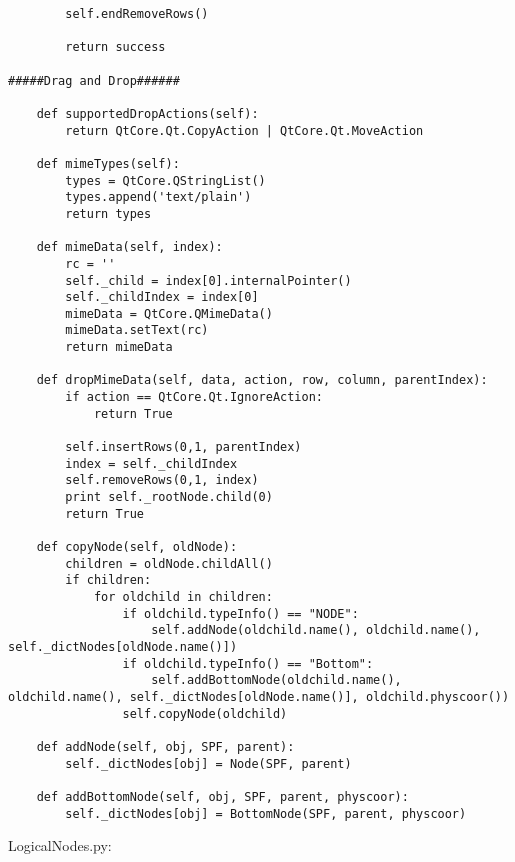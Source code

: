 \begin{verbatim}
        self.endRemoveRows()

        return success

#####Drag and Drop######

    def supportedDropActions(self):
        return QtCore.Qt.CopyAction | QtCore.Qt.MoveAction

    def mimeTypes(self):
        types = QtCore.QStringList()
        types.append('text/plain')
        return types

    def mimeData(self, index):  
        rc = ''
        self._child = index[0].internalPointer()
        self._childIndex = index[0]
        mimeData = QtCore.QMimeData()
        mimeData.setText(rc)
        return mimeData

    def dropMimeData(self, data, action, row, column, parentIndex):
        if action == QtCore.Qt.IgnoreAction:
            return True
        
        self.insertRows(0,1, parentIndex)
        index = self._childIndex
        self.removeRows(0,1, index)
        print self._rootNode.child(0)
        return True

    def copyNode(self, oldNode):
        children = oldNode.childAll()
        if children:
            for oldchild in children:
                if oldchild.typeInfo() == "NODE":
                    self.addNode(oldchild.name(), oldchild.name(), self._dictNodes[oldNode.name()])
                if oldchild.typeInfo() == "Bottom":
                    self.addBottomNode(oldchild.name(), oldchild.name(), self._dictNodes[oldNode.name()], oldchild.physcoor())
                self.copyNode(oldchild)
    
    def addNode(self, obj, SPF, parent):
        self._dictNodes[obj] = Node(SPF, parent)

    def addBottomNode(self, obj, SPF, parent, physcoor):
        self._dictNodes[obj] = BottomNode(SPF, parent, physcoor)
\end{verbatim}

LogicalNodes.py:

